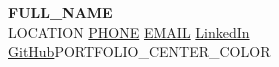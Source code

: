 \documentclass[10pt, letterpaper]{article}
\let\hrefWithoutArrow\href
\begin{document}
\begin{center}
    {\fontsize{26pt}{26pt}\selectfont\textbf{\textcolor{accentColor}{{{FULL_NAME}}}}}\\[5pt]
    \normalsize
    {{LOCATION}} \enspace{\color{accentColor}$|$}\enspace
    \hrefWithoutArrow{tel:{{PHONE_RAW}}}{{{PHONE}}} \enspace{\color{accentColor}$|$}\enspace
    \hrefWithoutArrow{mailto:{{EMAIL}}}{{{EMAIL}}} \enspace{\color{accentColor}$|$}\enspace
    \hrefWithoutArrow{{{LINKEDIN_URL}}}{LinkedIn} \enspace{\color{accentColor}$|$}\enspace
    \hrefWithoutArrow{{{GITHUB_URL}}}{GitHub}{{PORTFOLIO_CENTER_COLOR}}
\end{center}

\vspace{2pt}
\noindent{\color{accentColor}\rule{\textwidth}{1.2pt}}
\vspace{8pt}
\end{document}
